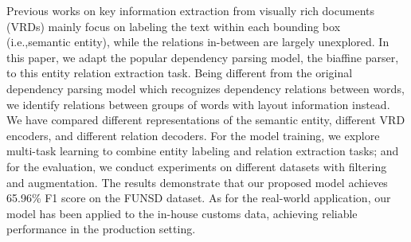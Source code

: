 Previous works on key information extraction from visually rich documents (VRDs) mainly focus on labeling the text within each bounding box (i.e.,semantic entity), while the relations  in-between  are  largely  unexplored.   In this  paper,  we  adapt  the  popular  dependency parsing  model,   the  biaffine  parser,   to  this entity  relation  extraction task. Being  different  from  the  original  dependency  parsing model which recognizes dependency relations between words, we identify relations between groups  of  words  with  layout  information  instead. We have compared different representations of the semantic entity, different VRD encoders, and different relation decoders. For the model training, we explore multi-task learning to combine entity labeling and relation extraction tasks; and for the evaluation, we conduct experiments on different datasets with filtering and  augmentation.    The  results  demonstrate that our proposed model achieves 65.96\% F1 score on the FUNSD dataset.  As for the real-world application, our model has been applied to  the  in-house  customs  data,  achieving  reliable performance in the production setting.
